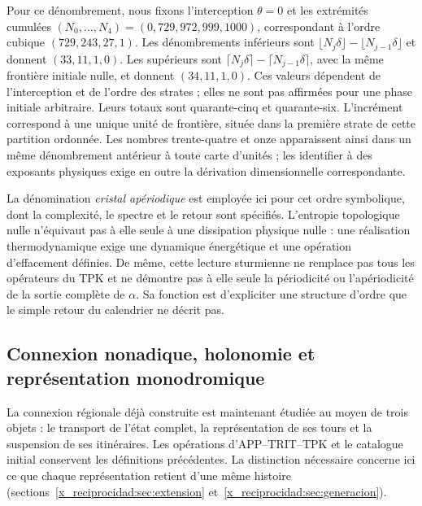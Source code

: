 Pour ce dénombrement, nous fixons l'interception \(\theta=0\) et les extrémités cumulées \((N_0,\ldots,N_4)=(0,729,972,999,1000)\), correspondant à l'ordre cubique \((729,243,27,1)\). Les dénombrements inférieurs sont \(\lfloor N_j\delta\rfloor-\lfloor N_{j-1}\delta\rfloor\) et donnent \((33,11,1,0)\). Les supérieurs sont \(\lceil N_j\delta\rceil-\lceil N_{j-1}\delta\rceil\), avec la même frontière initiale nulle, et donnent \((34,11,1,0)\). Ces valeurs dépendent de l'interception et de l'ordre des strates ; elles ne sont pas affirmées pour une phase initiale arbitraire. Leurs totaux sont quarante-cinq et quarante-six. L'incrément correspond à une unique unité de frontière, située dans la première strate de cette partition ordonnée. Les nombres trente-quatre et onze apparaissent ainsi dans un même dénombrement antérieur à toute carte d'unités ; les identifier à des exposants physiques exige en outre la dérivation dimensionnelle correspondante.

La dénomination \emph{cristal apériodique} est employée ici pour cet ordre symbolique, dont la complexité, le spectre et le retour sont spécifiés. L'entropie topologique nulle n'équivaut pas à elle seule à une dissipation physique nulle : une réalisation thermodynamique exige une dynamique énergétique et une opération d'effacement définies. De même, cette lecture sturmienne ne remplace pas tous les opérateurs du TPK et ne démontre pas à elle seule la périodicité ou l'apériodicité de la sortie complète de \(\alpha\). Sa fonction est d'expliciter une structure d'ordre que le simple retour du calendrier ne décrit pas.


\subsection{Connexion nonadique, holonomie et représentation monodromique}
\label{x_reciprocidad:mono-ampl:conexion}

La connexion régionale déjà construite est maintenant étudiée au moyen de trois objets : le transport de l'état complet, la représentation de ses tours et la suspension de ses itinéraires. Les opérations d'APP--TRIT--TPK et le catalogue initial conservent les définitions précédentes. La distinction nécessaire concerne ici ce que chaque représentation retient d'une même histoire (sections~\ref{x_reciprocidad:sec:extension} et~\ref{x_reciprocidad:sec:generacion}).

